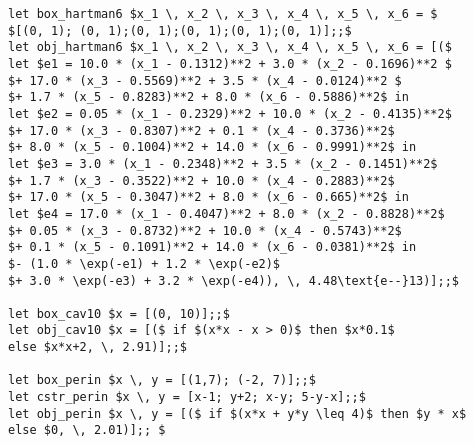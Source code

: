 {\begin{lstlisting}
let box_hartman6 $x_1 \, x_2 \, x_3 \, x_4 \, x_5 \, x_6 = $
$[(0, 1); (0, 1);(0, 1);(0, 1);(0, 1);(0, 1)];;$
let obj_hartman6 $x_1 \, x_2 \, x_3 \, x_4 \, x_5 \, x_6 = [($
let $e1 = 10.0 * (x_1 - 0.1312)**2 + 3.0 * (x_2 - 0.1696)**2 $
$+ 17.0 * (x_3 - 0.5569)**2 + 3.5 * (x_4 - 0.0124)**2 $
$+ 1.7 * (x_5 - 0.8283)**2 + 8.0 * (x_6 - 0.5886)**2$ in
let $e2 = 0.05 * (x_1 - 0.2329)**2 + 10.0 * (x_2 - 0.4135)**2$ 
$+ 17.0 * (x_3 - 0.8307)**2 + 0.1 * (x_4 - 0.3736)**2$
$+ 8.0 * (x_5 - 0.1004)**2 + 14.0 * (x_6 - 0.9991)**2$ in
let $e3 = 3.0 * (x_1 - 0.2348)**2 + 3.5 * (x_2 - 0.1451)**2$ 
$+ 1.7 * (x_3 - 0.3522)**2 + 10.0 * (x_4 - 0.2883)**2$
$+ 17.0 * (x_5 - 0.3047)**2 + 8.0 * (x_6 - 0.665)**2$ in
let $e4 = 17.0 * (x_1 - 0.4047)**2 + 8.0 * (x_2 - 0.8828)**2$ 
$+ 0.05 * (x_3 - 0.8732)**2 + 10.0 * (x_4 - 0.5743)**2$
$+ 0.1 * (x_5 - 0.1091)**2 + 14.0 * (x_6 - 0.0381)**2$ in
$- (1.0 * \exp(-e1) + 1.2 * \exp(-e2)$
$+ 3.0 * \exp(-e3) + 3.2 * \exp(-e4)), \, 4.48\text{e--}13)];;$

let box_cav10 $x = [(0, 10)];;$
let obj_cav10 $x = [($ if $(x*x - x > 0)$ then $x*0.1$ 
else $x*x+2, \, 2.91)];;$

let box_perin $x \, y = [(1,7); (-2, 7)];;$
let cstr_perin $x \, y = [x-1; y+2; x-y; 5-y-x];;$
let obj_perin $x \, y = [($ if $(x*x + y*y \leq 4)$ then $y * x$
else $0, \, 2.01)];; $


\end{lstlisting}
}

